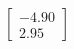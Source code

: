 \documentclass[preview]{standalone}
\begin{document}
\begin{align*}
\begin{bmatrix} -4.90 \\ 2.95 \end{bmatrix}
\end{align*}
\end{document}
